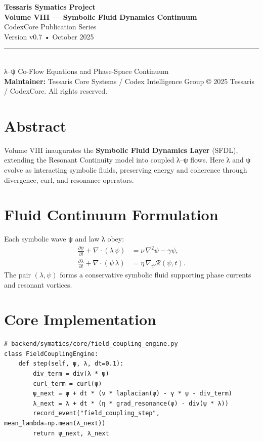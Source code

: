 \documentclass[11pt]{article}
\begin{document}
\begin{titlepage}
\centering
{\Huge \textbf{Tessaris Symatics Project}}\\[1.2cm]
{\LARGE \textbf{Volume VIII — Symbolic Fluid Dynamics Continuum}}\\[4pt]
{\large CodexCore Publication Series}\\[0.5cm]
{\small Version v0.7 • October 2025}\\[0.6cm]
\rule{0.6\textwidth}{0.5pt}\\[0.6cm]
{\large λ–ψ Co-Flow Equations and Phase-Space Continuum}\\[1cm]
\textbf{Maintainer:} Tessaris Core Systems / Codex Intelligence Group
\vfill
{\small © 2025 Tessaris / CodexCore. All rights reserved.}
\end{titlepage}

\section*{Abstract}
Volume VIII inaugurates the \textbf{Symbolic Fluid Dynamics Layer} (SFDL),
extending the Resonant Continuity model into coupled λ–ψ flows.
Here λ and ψ evolve as interacting symbolic fluids,
preserving energy and coherence through divergence, curl, and resonance operators.

\section{Fluid Continuum Formulation}
Each symbolic wave ψ and law λ obey:
\[
\begin{aligned}
\frac{\partial\psi}{\partial t} + \nabla\cdot(\lambda\,\psi)
  &= \nu\,\nabla^2\psi - \gamma\psi,\\[4pt]
\frac{\partial\lambda}{\partial t} + \nabla\cdot(\psi\,\lambda)
  &= \eta\,\nabla_\psi\mathcal{R}(\psi,t).
\end{aligned}
\]
The pair $(\lambda,\psi)$ forms a conservative symbolic fluid
supporting phase currents and resonant vortices.

\section{Core Implementation}
\begin{verbatim}
# backend/symatics/core/field_coupling_engine.py
class FieldCouplingEngine:
    def step(self, ψ, λ, dt=0.1):
        div_term = div(λ * ψ)
        curl_term = curl(ψ)
        ψ_next = ψ + dt * (ν * laplacian(ψ) - γ * ψ - div_term)
        λ_next = λ + dt * (η * grad_resonance(ψ) - div(ψ * λ))
        record_event("field_coupling_step", mean_lambda=np.mean(λ_next))
        return ψ_next, λ_next
\end{verbatim}
\end{document}
